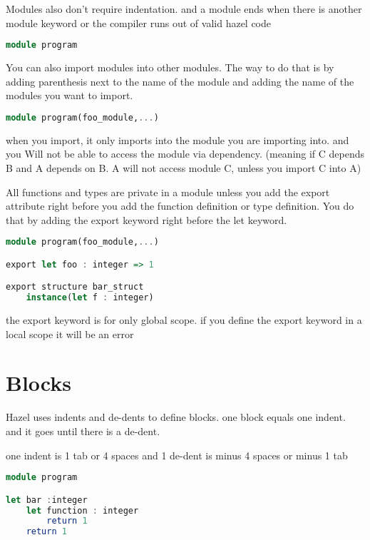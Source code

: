 \documentclass{article}
\begin{document}
Modules also don't require indentation. and a module ends when there is another
module keyword or the compiler runs out of valid hazel code


\begin{lstlisting}[language=Haskell, caption=How to define a module]
module program
\end{lstlisting}

You can also import modules into other modules. The way to do that is by adding parenthesis next to the name of the module
and adding the name of the modules you want to import. 
\begin{lstlisting}[language=Haskell, caption=How to import Other modules]
module program(foo_module,...)
\end{lstlisting}

when you import, it only imports into the module you are importing into. and you Will not be able to access the module via dependency. 
(meaning if C depends B and A depends on B. A will not access module C, unless you import C into A) 

All functions and types are private in a
module unless you add the export attribute right before you add the function definition or type definition.
You do that by adding the export keyword right before the let keyword. 

\begin{lstlisting}[language=Haskell, caption=exporting]
module program(foo_module,...)

export let foo : integer => 1

export structure bar_struct
    instance(let f : integer)
\end{lstlisting}

the export keyword is for only global scope. if you define the export keyword in a local scope
it will be an error

\section{Blocks}

Hazel uses indents and de-dents to define blocks. one block equals one indent. and it goes until there is a de-dent.

one indent is 1 tab or 4 spaces and 1 de-dent is minus 4 spaces or minus 1 tab

\begin{lstlisting}[language=Haskell]
module program

let bar :integer
    let function : integer 
        return 1
    return 1 
\end{lstlisting}
\end{document}
